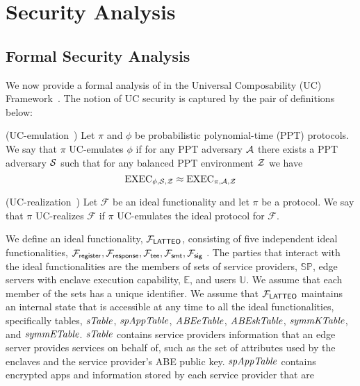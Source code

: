 
 



\section{\sysname Security Analysis}
\label{sec:full-sec-analysis} 
\subsection{Formal Security Analysis}
We now provide a formal analysis of \sysname in the Universal Composability (UC) Framework~\cite{Canetti01}. The notion of UC security is captured by the pair of definitions below:

\begin{definition}{(UC-emulation~\cite{Canetti01})}
\label{def:ucdef1}
Let $\pi$ and $\phi$ be probabilistic polynomial-time (PPT) protocols. We say that $\pi$ UC-emulates $\phi$ if for any PPT adversary $\mathcal{A}$ there exists a PPT adversary $\mathcal{S}$ such that for any balanced PPT environment $\mathcal{Z}$ we have
$$ \mathrm{EXEC}_{\phi, \mathcal{S}, \mathcal{Z}}  \approx \mathrm{EXEC}_{\pi, \mathcal{A}, \mathcal{Z}} $$
\end{definition}
 
\begin{definition}{(UC-realization~\cite{Canetti01})}
\label{def:ucdef2}
Let $\mathcal{F}$ be an ideal functionality and let $\pi$ be a protocol. We say that $\pi$ UC-realizes $\mathcal{F}$ if $\pi$ UC-emulates the ideal protocol for $\mathcal{F}$.
\end{definition}

We define an ideal functionality, $\mathcal{F}_{\mathsf{LATTEO}}$, consisting of five independent ideal functionalities, $\fregister, \fresp, \ftee%
, \fsmt, \fsig$%
.
The parties that interact with the ideal functionalities are the members of sets of service providers, $\mathbb{SP}$, edge servers with enclave execution capability, $\mathbb{E}$, %
and users $\mathbb{U}$. We assume that each member of the sets has a unique identifier.
We assume that $\mathcal{F}_{\mathsf{LATTEO}}$ maintains an internal state that is accessible at any time to all the ideal functionalities, specifically  %
tables,  $\mathit{sTable}$, $\mathit{spAppTable}$, $\mathit{ABEeTable}$, $\mathit{ABEskTable}$, $\mathit{symmKTable}$, and $\mathit{symmETable}$. %
$\mathit{sTable}$ contains service providers information that an edge server provides services on behalf of, such as the set of attributes used by the enclaves and the service provider's ABE public key. $\mathit{spAppTable}$ contains encrypted apps and information stored by each service provider that are 


